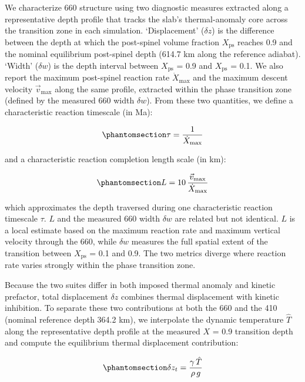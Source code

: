 \documentclass[draft,linenumbers]{agujournal2019}
\begin{document}
We characterize 660 structure using two diagnostic measures extracted
along a representative depth profile that tracks the slab's
thermal-anomaly core across the transition zone in each simulation.
`Displacement' (\(\delta z\)) is the difference between the depth at
which the post-spinel volume fraction \(X_\mathrm{ps}\) reaches 0.9 and
the nominal equilibrium post-spinel depth (614.7 km along the reference
adiabat). `Width' (\(\delta w\)) is the depth interval between
\(X_\mathrm{ps}\) = 0.9 and \(X_\mathrm{ps}\) = 0.1. We also report the
maximum post-spinel reaction rate \(\dot{X}_\mathrm{max}\) and the
maximum descent velocity \(\vec{v}_\mathrm{max}\) along the same
profile, extracted within the phase transition zone (defined by the
measured 660 width \(\delta w\)). From these two quantities, we define a
characteristic reaction timescale (in Ma):

\begin{equation}\protect\phantomsection\label{eq:reaction-timescale}{\tau = \frac{1}{\dot{X}_\mathrm{max}}}\end{equation}

and a characteristic reaction completion length scale (in km):

\begin{equation}\protect\phantomsection\label{eq:characteristic-length-scale}{L = 10\, \frac{\vec{v}_\mathrm{max}}{\dot{X}_\mathrm{max}}}\end{equation}

which approximates the depth traversed during one characteristic
reaction timescale \(\tau\). \(L\) and the measured 660 width
\(\delta w\) are related but not identical. \(L\) is a local estimate
based on the maximum reaction rate and maximum vertical velocity through
the 660, while \(\delta w\) measures the full spatial extent of the
transition between \(X_\mathrm{ps}\) = 0.1 and 0.9. The two metrics
diverge where reaction rate varies strongly within the phase transition
zone.

Because the two suites differ in both imposed thermal anomaly and
kinetic prefactor, total displacement \(\delta z\) combines thermal
displacement with kinetic inhibition. To separate these two
contributions at both the 660 and the 410 (nominal reference depth 364.2
km), we interpolate the dynamic temperature \(\hat{T}\) along the
representative depth profile at the measured \(X\) = 0.9 transition
depth and compute the equilibrium thermal displacement contribution:

\begin{equation}\protect\phantomsection\label{eq:thermal-displacement}{\delta z_t = \frac{\gamma\, \hat{T}}{\rho\, g}}\end{equation}
\end{document}
